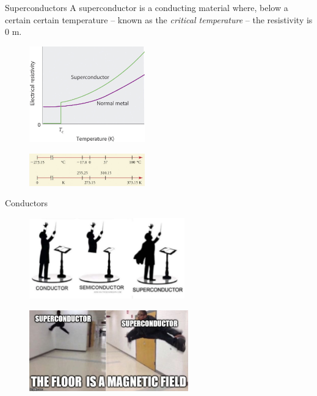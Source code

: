 \documentclass[../Main.tex]{subfiles}
\begin{document}
\begin{frame}{Superconductors}
    A superconductor is a conducting material where, below a certain certain temperature -- known as the \emph{critical temperature} -- the resistivity is 0 {\Omega}m.
    
    \begin{figure}
        \centering
        \includegraphics[width=5cm]{Electricity_Images/critical_temp.jpg}
    \end{figure}
    \begin{figure}
        \centering
        \includegraphics[width=5cm]{Electricity_Images/kelvin_scale.jpg}
    \end{figure}
\end{frame}

\begin{frame}{Conductors}
    \begin{figure}
        \centering
        \includegraphics[height=3.5cm]{Electricity_Images/conductors.jpg}
    \end{figure}
    \pause
    \begin{figure}
        \centering
        \includegraphics[height=3.5cm]{Electricity_Images/floor_is_magnetic_field.jpg}
    \end{figure}
\end{frame}
\end{document}
